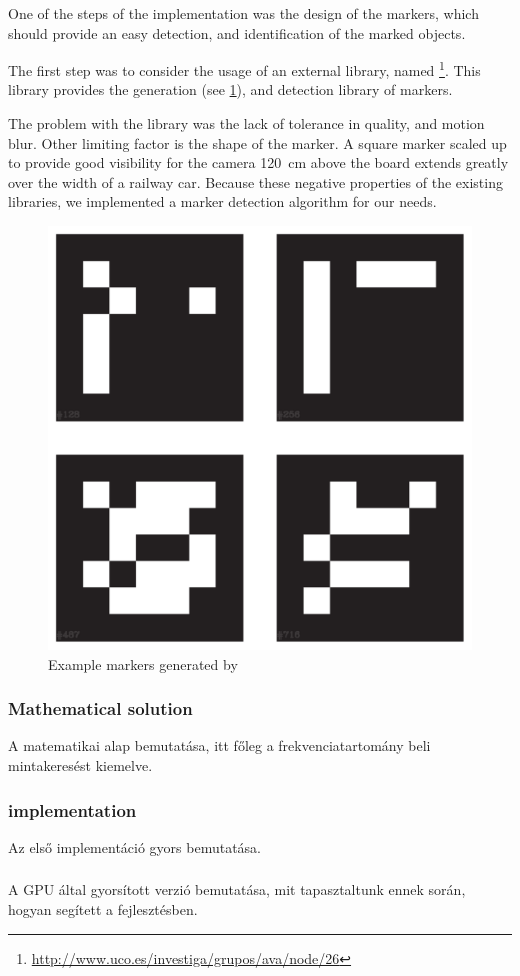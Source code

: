 One of the steps of the  implementation was the design of the markers, which should provide an easy detection, and identification of the marked objects.

The first step was to consider the usage of an external library, named \footnote{\url{http://www.uco.es/investiga/grupos/ava/node/26}}. This library provides the generation (see \ref{fig:aruco_markers}), and detection library of markers.

The problem with the library was the lack of tolerance in quality, and motion blur. Other limiting factor is the shape of the marker. A square marker scaled up to provide good visibility for the camera 120~\si{\centi\meter} above the board extends greatly over the width of a railway car. Because these negative properties of the existing libraries, we implemented a marker detection algorithm for our needs.

\begin{figure}[h]
	\centering
	\label{fig:aruco_markers}
	\includegraphics[width=0.35\linewidth]{include/figures/chapter_6/opencv_2}
	\caption{Example markers generated by }
\end{figure}

\subsubsection{Mathematical solution}
A matematikai alap bemutatása, itt főleg a frekvenciatartomány beli mintakeresést kiemelve.
\subsubsection{ implementation}
Az első implementáció gyors bemutatása.
\subsubsection{}
A GPU által gyorsított verzió bemutatása, mit tapasztaltunk ennek során, hogyan segített a fejlesztésben.

